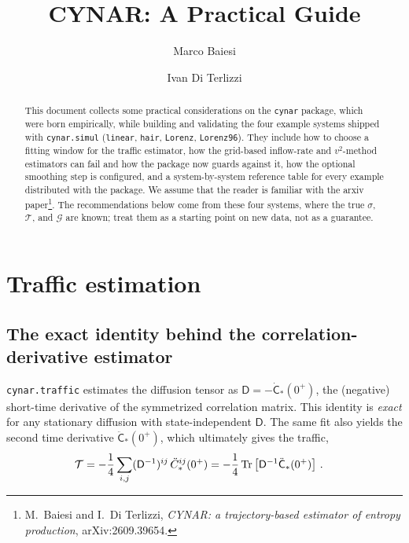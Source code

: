 \documentclass[11pt]{article}
\title{CYNAR: A Practical Guide}
\author{Marco Baiesi \and Ivan Di Terlizzi}
\date{}
\newcommand{\traffic}{\mathcal{T}}
\newcommand{\inflow}{\mathcal{G}}
\newcommand{\MD}{{\mathsf{D}}}
\begin{document}
\maketitle

\begin{abstract}
This document collects some practical considerations on the \texttt{cynar} package, which were born empirically, while building and validating the four example systems shipped with \texttt{cynar.simul} (\texttt{linear}, \texttt{hair}, \texttt{Lorenz}, \texttt{Lorenz96}).
They include how to choose a fitting window for the traffic estimator, how the grid-based inflow-rate and $v^2$-method estimators can fail and how the package now guards against it, how the optional smoothing step is configured, and a system-by-system reference table for every example distributed with the package.
We assume that the reader is familiar with the arxiv paper\footnote{M.~Baiesi and I.~Di Terlizzi, \emph{CYNAR: a trajectory-based estimator of entropy production}, arXiv:2609.39654.}. The recommendations below come from these four systems, where the true $\sigma$, $\traffic$, and $\inflow$ are known; treat them as a starting point on new data, not as a guarantee.
\end{abstract}

\tableofcontents

\section{Traffic estimation}
\label{sec:traffic}

\subsection{The exact identity behind the correlation-derivative estimator}

\texttt{cynar.traffic} estimates the diffusion tensor as $\MD = -\dot{\mathsf{C}}_*(0^+)$, the (negative) short-time derivative of the symmetrized correlation matrix. This identity is \emph{exact} for any stationary diffusion with state-independent $\MD$. The same fit also yields the second time derivative $\ddot{\mathsf{C}}_*(0^+)$, which ultimately gives the traffic,
\begin{align}
\label{traffic}
\traffic
&= -\frac 1 4 \sum_{i,j}(\MD^{-1})^{ij}\,\ddot C_*^{ij}(0^+)= -\frac 1 4 \Tr\left[\MD^{-1}\ddot{\mathsf{C}}_*(0^+)\right]\,.
\end{align}

\end{document}
